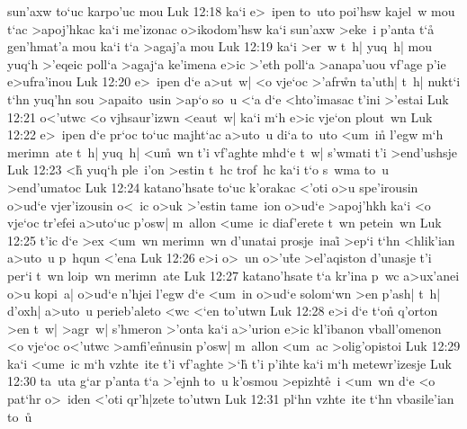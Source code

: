 sun'axw
to`uc
karpo'uc
mou\bibvsend
\vs Luk 12:18
ka`i
e>~ipen
to~uto
poi'hsw
kajel~w
mou
t`ac
>apoj'hkac
ka`i
me'izonac
o>ikodom'hsw
ka`i
sun'axw
>eke~i
p'anta
t`a\r{}
gen'hmat'a
mou
ka`i
t`a
>agaj'a
mou\bibvsend
\vs Luk 12:19
ka`i
>er~w
t~h|
yuq~h|
mou
yuq`h
>'eqeic
poll`a
>agaj`a
ke'imena
e>ic
>'eth
poll`a
>anapa'uou
vf'age
p'ie
e>ufra'inou\bibvsend
\vs Luk 12:20
e>~ipen
d`e
a>ut~w|
<o
vje`oc
>'afr\r{w}n
ta'uth|
t~h|
nukt`i
t`hn
yuq'hn
sou
>apaito~usin
>ap`o
so~u
<`a
d`e
<hto'imasac
t'ini
>'estai\bibvsend
\vs Luk 12:21
o<'utwc
<o
vjhsaur'izwn
<eaut~w|
ka`i
m`h
e>ic
vje`on
plout~wn\bibvsend
\vs Luk 12:22
e>~ipen
d`e
pr`oc
to`uc
majht`ac
a>uto~u
di`a
to~uto
<um~in\r{}
l'egw
m`h
merimn~ate
t~h|
yuq~h|
<u\r{m}~wn
t'i
vf'aghte
mhd`e
t~w|
s'wmati
t'i
>end'ushsje\bibvsend
\vs Luk 12:23
<h\r{}
yuq`h
ple~i'on
>estin
t~hc
trof~hc
ka`i
t`o
s~wma
to~u
>end'umatoc\bibvsend
\vs Luk 12:24
katano'hsate
to`uc
k'orakac
<'oti
o>u
spe'irousin
o>ud`e
vjer'izousin
o<~ic
o>uk
>'estin
tame~ion
o>ud`e
>apoj'hkh
ka`i
<o
vje`oc
tr'efei
a>uto`uc
p'osw|
m~allon
<ume~ic
diaf'erete
t~wn
petein~wn\bibvsend
\vs Luk 12:25
t'ic
d`e
>ex
<um~wn
merimn~wn
d'unatai
prosje~inai\r{}
>ep`i
t`hn
<hlik'ian
a>uto~u
p~hqun
<'ena\bibvsend
\vs Luk 12:26
e>i
o>~un
o>'u\r{t}e
>el'aqiston
d'unasje
t'i
per`i
t~wn
loip~wn
merimn~ate\bibvsend
\vs Luk 12:27
katano'hsate
t`a
kr'ina
p~wc
a>ux'anei
o>u
kopi~a|
o>ud`e
n'hjei
l'egw
d`e
<um~in
o>ud`e
solom`wn
>en
p'ash|
t~h|
d'oxh|
a>uto~u
perieb'aleto
<wc
<`en
to'utwn\bibvsend
\vs Luk 12:28
e>i
d`e
t`on\r{}
q'orton
>en
t~w|
>agr~w|
s'hmeron
>'onta
ka`i
a>'urion
e>ic
kl'ibanon
vball'omenon
<o
vje`oc
o<'utwc
>amfi'e\r{n}nusin
p'osw|
m~allon
<um~ac
>olig'opistoi\bibvsend
\vs Luk 12:29
ka`i
<ume~ic
m`h
vzhte~ite
t'i
vf'aghte
>`h\r{}
t'i
p'ihte
ka`i
m`h
metewr'izesje\bibvsend
\vs Luk 12:30
ta~uta
g`ar
p'anta
t`a
>'ejnh
to~u
k'osmou
>epizht\r{e}~i
<um~wn
d`e
<o
pat`hr
o>~iden
<'oti
qr'h|zete
to'utwn\bibvsend
\vs Luk 12:31
pl`hn
vzhte~ite
t`hn
vbasile'ian
to~u\r{}
